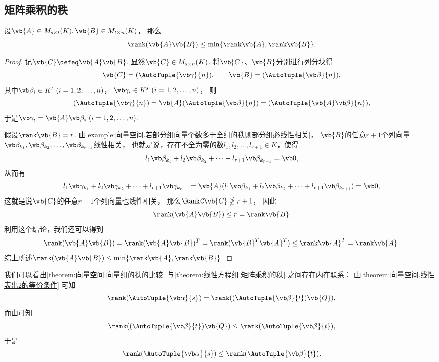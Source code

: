 \subsection{矩阵乘积的秩}
\begin{theorem}\label{theorem:线性方程组.矩阵乘积的秩}
设\(\vb{A} \in M_{s \times t}(K),
\vb{B} \in M_{t \times n}(K)\)，
那么\[
	\rank(\vb{A}\vb{B}) \leq \min\{\rank\vb{A},\rank\vb{B}\}.
\]
\begin{proof}
记\(\vb{C} \defeq \vb{A}\vb{B}\).
显然\(\vb{C} \in M_{s \times n}(K)\).
将\(\vb{C}\)、\(\vb{B}\)分别进行列分块得\[
	\vb{C} = (\AutoTuple{\vb\gamma}{n}),
	\qquad
	\vb{B} = (\AutoTuple{\vb\beta}{n}),
\]
其中\(\vb\beta_i \in K^t\ (i=1,2,\dotsc,n)\)，
\(\vb\gamma_i \in K^s\ (i=1,2,\dotsc,n)\)，
则\[
	(\AutoTuple{\vb\gamma}{n})
	= \vb{A} (\AutoTuple{\vb\beta}{n})
	= (\AutoTuple{\vb{A}\vb\beta}{n}),
\]
于是\(\vb\gamma_i = \vb{A} \vb\beta_i\ (i=1,2,\dotsc,n)\).

假设\(\rank\vb{B} = r\).
由\cref{example:向量空间.若部分组向量个数多于全组的秩则部分组必线性相关}，
\(\vb{B}\)的任意\(r+1\)个列向量
\(\vb\beta_{k_1},\vb\beta_{k_2},\dotsc,\vb\beta_{k_{r+1}}\)线性相关，
也就是说，存在不全为零的数\(l_1,l_2,\dotsc,l_{r+1}\in K\)，使得\[
	l_1 \vb\beta_{k_1} + l_2 \vb\beta_{k_2} + \dotsb + l_{r+1} \vb\beta_{k_{r+1}} = \vb0,
\]
从而有\[
	l_1 \vb\gamma_{k_1} + l_2 \vb\gamma_{k_2} + \dotsb + l_{r+1} \vb\gamma_{k_{r+1}}
	= \vb{A}(l_1 \vb\beta_{k_1} + l_2 \vb\beta_{k_2} + \dotsb + l_{r+1} \vb\beta_{k_{r+1}})
	= \vb0,
\]
这就是说\(\vb{C}\)的任意\(r+1\)个列向量也线性相关，
那么\(\RankC\vb{C} \ngeq r+1\)，
因此\[
	\rank(\vb{A}\vb{B})
	\leq r = \rank\vb{B}.
\]
利用这个结论，我们还可以得到\[
	\rank(\vb{A}\vb{B})
	= \rank(\vb{A}\vb{B})^T
	= \rank(\vb{B}^T \vb{A}^T)
	\leq \rank \vb{A}^T
	= \rank \vb{A}.
\]
综上所述\(\rank(\vb{A}\vb{B}) \leq \min\{\rank\vb{A},\rank\vb{B}\}\).
\end{proof}
\end{theorem}
\begin{remark}
我们可以看出\cref{theorem:向量空间.向量组的秩的比较}
与\cref{theorem:线性方程组.矩阵乘积的秩} 之间存在内在联系：
由\cref{theorem:向量空间.线性表出2的等价条件} 可知\[
	\rank(\AutoTuple{\vb\alpha}{s})
	= \rank((\AutoTuple{\vb\beta}{t})\vb{Q}),
\]
而由可知\[
	\rank((\AutoTuple{\vb\beta}{t})\vb{Q})
	\leq \rank(\AutoTuple{\vb\beta}{t}),
\]
于是\[
	\rank(\AutoTuple{\vb\alpha}{s})
	\leq \rank(\AutoTuple{\vb\beta}{t}).
\]
\end{remark}

